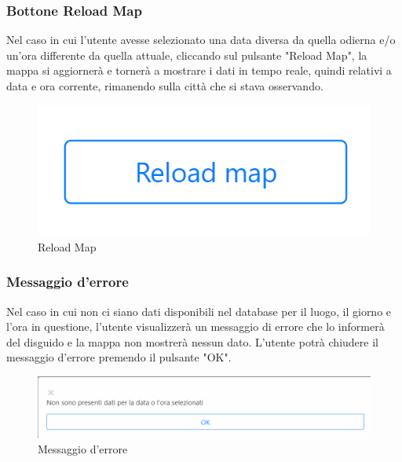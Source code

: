 \subsubsection{Bottone Reload Map} \label{UtilizzoDiGDPGatheringDetecionPlatformContenutoCentralePaginaInizialeHomeBottoneReloadMap}
Nel caso in cui l'utente avesse selezionato una data diversa da quella odierna e/o un'ora differente da quella attuale, cliccando sul pulsante "Reload Map", la mappa si aggiornerà e tornerà a mostrare i dati in tempo reale, quindi relativi a data e ora corrente, rimanendo sulla città che si stava osservando. 
\begin{center}
	\begin{figure}
		\includegraphics[width=0.3\linewidth]{../immagini/manualeUtente/ReloadMap.png}
		\caption{Reload Map}
	\end{figure}
\end{center}

\subsubsection{Messaggio d'errore} \label{UtilizzoDiGDPGatheringDetecionPlatformContenutoCentralePaginaInizialeHomeMessaggioDiErrore}
Nel caso in cui non ci siano dati disponibili nel database per il luogo, il giorno e l'ora in questione, l'utente visualizzerà un messaggio di errore che lo informerà del disguido e la mappa non mostrerà nessun dato. L'utente potrà chiudere il messaggio d'errore premendo il pulsante "OK". 
\begin{center}
	\begin{figure}
		\includegraphics[width=0.5\linewidth]{../immagini/manualeUtente/MessaggioErrore.png}
		\caption{Messaggio d'errore}
	\end{figure}
\end{center}

